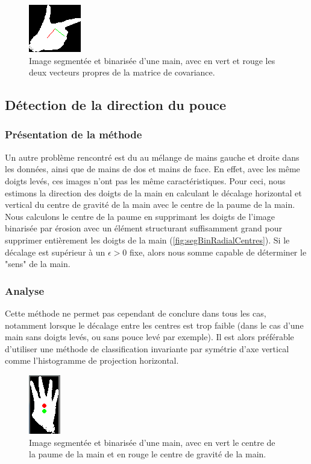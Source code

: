 \begin{figure}[htb!]
\centerline{\includegraphics{direction.png}}
\caption{Image segmentée et binarisée d'une main, avec en vert et rouge les deux vecteurs propres de la matrice de covariance.}
\label{fig:pca}
\end{figure}

\subsection{Détection de la direction du pouce}
\subsubsection{Présentation de la méthode}
Un autre problème rencontré est du au mélange de mains gauche et droite dans les données, ainsi que de mains de dos et mains de face. En effet, avec les même doigts levés, ces images n'ont pas les même caractéristiques. Pour ceci, nous estimons la direction des doigts de la main en calculant le décalage horizontal et vertical du centre de gravité de la main avec le centre de la paume de la main. Nous calculons le centre de la paume en supprimant les doigts de l'image binarisée par érosion avec un élément structurant suffisamment grand pour supprimer entièrement les doigts de la main (\autoref{fig:segBinRadialCentres}). Si le décalage est supérieur à un $\epsilon > 0$ fixe, alors nous somme capable de déterminer le "sens" de la main.

\subsubsection{Analyse}
Cette méthode ne permet pas cependant de conclure dans tous les cas, notamment lorsque le décalage entre les centres est trop faible (dans le cas d'une main sans doigts levés, ou sans pouce levé par exemple). Il est alors préférable d'utiliser une méthode de classification invariante par symétrie d'axe vertical comme l'histogramme de projection horizontal.

\begin{figure}[htb!]
\centerline{\includegraphics{handCenters.png}}
\caption{Image segmentée et binarisée d'une main, avec en vert le centre de la paume de la main et en rouge le centre de gravité de la main.}
\label{fig:segBinRadialCentres}
\end{figure}